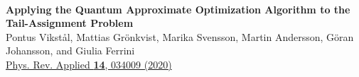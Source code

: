 
\newcommand{\paperitem}[1]{~\hfill\textbf{\Huge{Paper~#1}}\\[15mm]}
{}

\cleardoublepage
\pagestyle{empty}
\makeatletter
\renewcommand{\@chapapp}{\vspace*{50mm}\hfill Paper}
\makeatother

\vspace*{60mm}
~\hfill\textbf{\Huge{}}\\[15mm]
{\bf Applying the Quantum Approximate Optimization Algorithm to the Tail-Assignment Problem}\\
\newblock Pontus Vikstål, Mattias Grönkvist, Marika Svensson, Martin Andersson, Göran Johansson, and Giulia Ferrini \\
\newblock \href{http://dx.doi.org/10.1103/PhysRevApplied.14.034009}{Phys. Rev. Applied \textbf{14}, 034009 (2020)}
\vfill

\cleardoublepage
